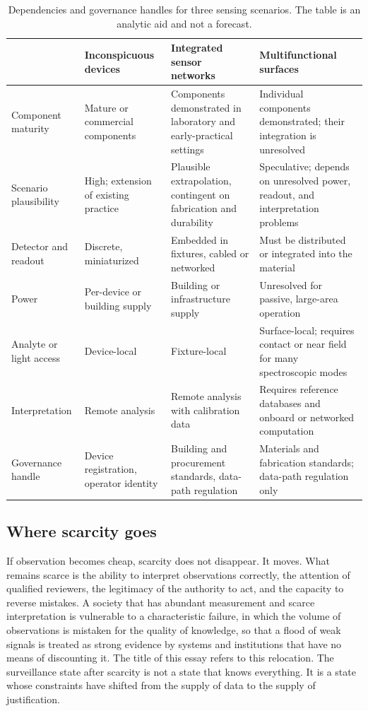 \documentclass[11pt]{article}
\theoremstyle{plain}
\theoremstyle{definition}
\theoremstyle{remark}
\begin{document}
\begin{table}[h]
\centering
\small
\begin{tabular}{p{2.6cm}p{3.7cm}p{3.7cm}p{3.7cm}}
\toprule
 & Inconspicuous devices & Integrated sensor networks & Multifunctional surfaces\\
\midrule
Component maturity & Mature or commercial components & Components demonstrated in laboratory and early-practical settings & Individual components demonstrated; their integration is unresolved\\
Scenario plausibility & High; extension of existing practice & Plausible extrapolation, contingent on fabrication and durability & Speculative; depends on unresolved power, readout, and interpretation problems\\
Detector and readout & Discrete, miniaturized & Embedded in fixtures, cabled or networked & Must be distributed or integrated into the material\\
Power & Per-device or building supply & Building or infrastructure supply & Unresolved for passive, large-area operation\\
Analyte or light access & Device-local & Fixture-local & Surface-local; requires contact or near field for many spectroscopic modes\\
Interpretation & Remote analysis & Remote analysis with calibration data & Requires reference databases and onboard or networked computation\\
Governance handle & Device registration, operator identity & Building and procurement standards, data-path regulation & Materials and fabrication standards; data-path regulation only\\
\bottomrule
\end{tabular}
\caption{Dependencies and governance handles for three sensing scenarios. The table is an analytic aid and not a forecast.}
\label{tab:scenarios}
\end{table}

\subsection{Where scarcity goes}

If observation becomes cheap, scarcity does not disappear. It moves. What remains scarce is the ability to interpret observations correctly, the attention of qualified reviewers, the legitimacy of the authority to act, and the capacity to reverse mistakes. A society that has abundant measurement and scarce interpretation is vulnerable to a characteristic failure, in which the volume of observations is mistaken for the quality of knowledge, so that a flood of weak signals is treated as strong evidence by systems and institutions that have no means of discounting it. The title of this essay refers to this relocation. The surveillance state after scarcity is not a state that knows everything. It is a state whose constraints have shifted from the supply of data to the supply of justification.
\end{document}
